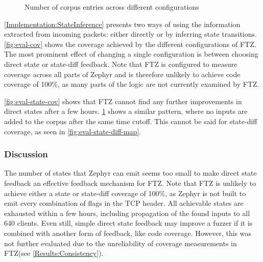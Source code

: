 \documentclass[twocolumn]{article}
\newcommand{\proj}{FTZ\xspace}
\begin{document}
\begin{figure}
  \caption{Number of corpus entries across different configurations}
  \label{fig:eval-corpus}
\end{figure}

\cref{Implementation:StateInference} presents two ways of using the information extracted from incoming packets: either directly or by inferring state transitions. \cref{fig:eval-cov} shows the coverage achieved by the different configurations of \proj. The most prominent effect of changing a single configuration is between choosing direct state or state-diff feedback. Note that \proj is configured to measure coverage across all parts of Zephyr and is therefore unlikely to achieve code coverage of 100\%, as many parts of the logic are not currently examined by \proj.

\cref{fig:eval-state-cov} shows that \proj cannot find any further improvements in direct states after a few hours. \cref{fig:eval-corpus} shows a similar pattern, where no inputs are added to the corpus after the same time cutoff. This cannot be said for state-diff coverage, as seen in \cref{fig:eval-state-diff-map}.

\subsubsection*{Discussion}

The number of states that Zephyr can emit seems too small to make direct state feedback an effective feedback mechanism for \proj. Note that \proj is unlikely to achieve either a state or state-diff coverage of 100\%, as Zephyr is not built to emit every combination of flags in the TCP header. All achievable states are exhausted within a few hours, including propagation of the found inputs to all 640 clients. Even still, simple direct state feedback may improve a fuzzer if it is combined with another form of feedback, like code coverage. However, this was not further evaluated due to the unreliability of coverage measurements in \proj (see \cref{Results:Consistency}).
\end{document}

